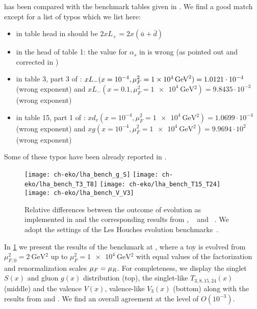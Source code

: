 \eko{} has been compared with the benchmark tables
given in \cite{Giele:2002hx,Dittmar:2005ed}.
We find a good match except for a list of typos which we list here:
\begin{itemize}
    \item in table head in \cite{Giele:2002hx} should be $2xL_+ = 2x(\bar u + \bar d)$
    \item in the head of table 1: the value for $\alpha_s$ in \ffns{} is wrong (as pointed out and corrected in \cite{Dittmar:2005ed})
    \item in table 3, part 3 of \cite{Giele:2002hx}: $xL_-(x=10^{-4}, \muF^2 = \SI{1e4}{\GeV^2})=1.0121\cdot 10^{-4}$ (wrong exponent) and
          $xL_-(x=0.1, \mu_F^2 = \SI{1e4}{\GeV^2})=9.8435\cdot 10^{-3}$ (wrong exponent)
    \item in table 15, part 1 of \cite{Dittmar:2005ed}: $xd_v(x=10^{-4}, \mu_F^2 = \SI{1e4}{\GeV^2}) = 1.0699\cdot 10^{-4}$ (wrong exponent) and
          $xg(x=10^{-4}, \mu_F^2 = \SI{1e4}{\GeV^2}) = 9.9694\cdot 10^{2}$ (wrong exponent)
\end{itemize}
Some of these typos have been already reported in \cite{Diehl:2021gvs}.

\begin{figure}
    \centering
    \texttt{[image: ch-eko/lha\_bench\_g\_S]}
    \texttt{[image: ch-eko/lha\_bench\_T3\_T8]}
    \texttt{[image: ch-eko/lha\_bench\_T15\_T24]}
    \texttt{[image: ch-eko/lha\_bench\_V\_V3]}
    \caption{Relative differences between 
        the outcome of \nnlo{} \qcd{} evolution
        as implemented in \eko{} and the
        corresponding results from \cite{Dittmar:2005ed}, \apfel{}~\cite{Bertone:2013vaa} and \pegasus{}~\cite{Vogt:2004ns}.
        We adopt the settings of the Les Houches \pdf{} evolution benchmarks~\cite{Giele:2002hx,Dittmar:2005ed}.}
    \label{fig:LHAbench}
\end{figure}

In \cref{fig:LHAbench} we present the results of the \vfns{} benchmark at \nnlo{}, where a
toy \pdf{} is evolved from $\mu_{F,0}^2=\SI{2}{\GeV^2}$ up to $\mu_{F}^2=\SI{1e4}{\GeV^2}$
with equal values of the factorization and renormalization scales $\mu_F=\mu_R$.
For completeness, we display the singlet $S(x)$ and gluon $g(x)$ distribution (top), the singlet-like $T_{3,8,15,24}(x)$ (middle)
and the valence $V(x)$, valence-like $V_{3}(x)$ (bottom) along with
the results from \apfel{} and \pegasus{}. We find an overall agreement at the level of $O(10^{-3})$.
